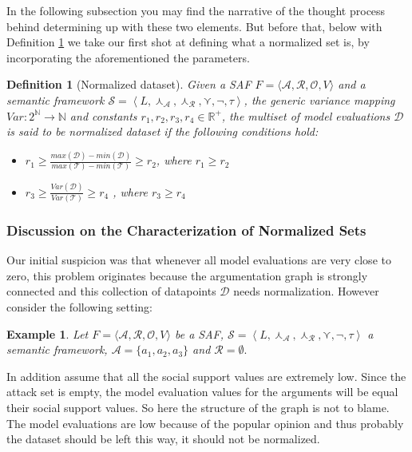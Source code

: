 \documentclass{article}
\newtheorem{definition}{Definition}
\newtheorem{example}{Example}
\newcommand{\nat}{\mathbb{N}}   %
\newcommand{\real}{\mathbb{R}}  %
\newcommand{\args}{\mathcal{A}} %
\newcommand{\att}{\mathcal{R}}  %
\newcommand{\valueset}{L}
\newcommand{\obj}{\mathcal{O}} %
\newcommand{\safid}{F}               %
\newcommand{\safbodyO}{\langle \args, \att, \obj, V \rangle} %
\newcommand{\safO}{\safid = \safbodyO} %
\newcommand{\sembodyNew}{\left\langle \valueset,\SAFand_\mathcal{A}, \SAFand_\mathcal{R},\SAFor,\lnot,\tau \right\rangle} %
\newcommand{\SAFand}{\curlywedge}     %
\newcommand{\SAFor}{\curlyvee}        %
\newcommand{\sem}{\mathcal{S}}
\newcommand{\dataset}{\mathcal{D}}   %
\newcommand{\ssset}{\mathcal{T}}   %
\begin{document}
In the following subsection you may find the narrative of the thought process behind determining up with these two elements. But before that, below with Definition \ref{def:normSet} we take our first shot at defining what a normalized set is, by incorporating the aforementioned the parameters.


\begin{definition} [Normalized dataset]
\label{def:normSet}  
Given a SAF $\safO$ and a semantic framework $\sem = \sembodyNew$, the generic variance mapping $Var: 2^{\nat} \rightarrow \nat$ and constants $r_1,  r_2, r_3, r_4 \in \real^+$, the multiset of model evaluations $\dataset$ is said to be normalized dataset if the following conditions hold:
\begin{itemize}
\item $r_1 \geq \frac{max(\dataset) - min(\dataset)}{max(\ssset) - min(\ssset)} \geq r_2$, where $r_1  \geq r_2$
\item $r_3 \geq \frac{Var(\dataset)}{Var(\ssset)} \geq r_4$ , where $r_3  \geq r_4$
\end{itemize}
\end{definition}

\begin{comment}
\begin{example}
Let $\safO$ be a SAF, $\sem = \sembodyNew$ a semantic framework, $\args =\{a_1, a_2, a_3\}$ and $\att =\{\}.$
\end{example}
\end{comment}

\subsubsection{Discussion on the Characterization of Normalized Sets}

Our initial suspicion was that whenever all model evaluations are very close to zero, this problem originates because the argumentation graph is strongly connected and this collection of datapoints $\dataset$ needs normalization. However consider the following setting:

\begin{example}
Let $\safO$ be a SAF, $\sem = \sembodyNew$ a semantic framework, $\args =\{a_1, a_2, a_3\}$ and $\att = \emptyset.$
\end{example}

In addition assume that all the social support values are extremely low. Since the attack set is empty, the model evaluation values for the arguments will be equal their social support values. So here the structure of the graph is not to blame. The model evaluations are low because of the popular opinion and thus probably the dataset should be left this way, it should not be normalized.
 
\end{document}
